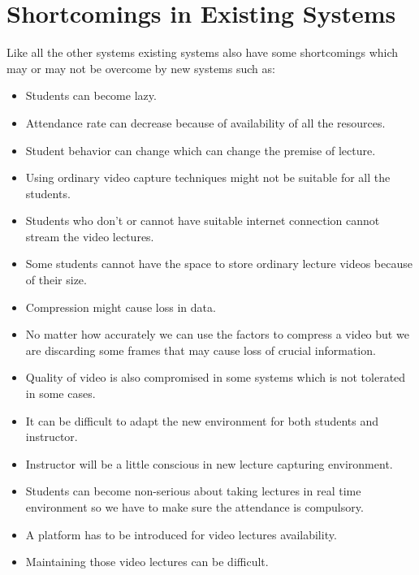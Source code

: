 \section{Shortcomings in Existing Systems}
Like all the other systems existing systems also have some shortcomings which may or may not be overcome by new systems such as:
\begin{itemize}
	\item Students can become lazy.
    \item Attendance rate can decrease because of availability of all the resources.
    \item Student behavior can change which can change the premise of lecture.
    \item Using ordinary video capture techniques might not be suitable for all the students.
    \item Students who don't or cannot have suitable internet connection cannot stream the video lectures.
    \item Some students cannot have the space to store ordinary lecture videos because of their size.
    \item Compression might cause loss in data.
    \item No matter how accurately we can use the factors to compress a video but we are discarding some frames that may cause loss of crucial information.
    \item Quality of video is also compromised in some systems which is not tolerated in some cases.
    \item It can be difficult to adapt the new environment for both students and instructor.
    \item Instructor will be a little conscious in new lecture capturing environment.
    \item Students can become non-serious about taking lectures in real time environment so we have to make sure the attendance is compulsory.
    \item A platform has to be introduced for video lectures availability.
    \item Maintaining those video lectures can be difficult. 
\end{itemize}



